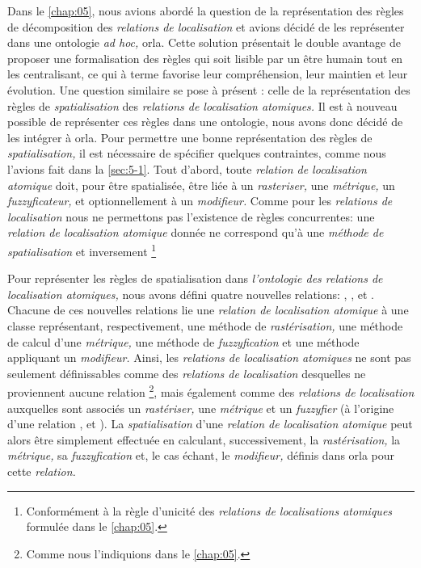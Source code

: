 Dans le \autoref{chap:05}, nous avions abordé la question de la
représentation des règles de décomposition des \emph{relations de
  localisation} et avions décidé de les représenter dans une ontologie
\emph{ad hoc,} \ac{orla}. Cette solution présentait le double avantage
de proposer une formalisation des règles qui soit lisible par un être
humain tout en les centralisant, ce qui à terme favorise leur
compréhension, leur maintien et leur évolution. Une question similaire
se pose à présent : celle de la représentation des règles de
\emph{spatialisation} des \emph{relations de localisation atomiques.}
Il est à nouveau possible de représenter ces règles dans une
ontologie, nous avons donc décidé de les intégrer à \ac{orla}. Pour
permettre une bonne représentation des règles de
\emph{spatialisation,} il est nécessaire de spécifier quelques
contraintes, comme nous l'avions fait dans la \autoref{sec:5-1}. Tout
d'abord, toute \emph{relation de localisation atomique} doit, pour
être spatialisée, être liée à un \emph{rasteriser,} une
\emph{métrique,} un \emph{fuzzyficateur,} et optionnellement à un
\emph{modifieur.} Comme pour les \emph{relations de localisation} nous
ne permettons pas l’existence de règles concurrentes: une
\emph{relation de localisation atomique} donnée ne correspond qu'à une
\emph{méthode de spatialisation} et inversement \footnote{Conformément
  à la règle d'unicité des \emph{relations de localisations atomiques}
  formulée dans le \autoref{chap:05}.}

Pour représenter les règles de spatialisation dans \emph{l'ontologie
  des relations de localisation atomiques,} nous avons défini quatre
nouvelles relations: ,
,  et
. Chacune de ces nouvelles relations lie
une \emph{relation de localisation atomique} à une classe
représentant, respectivement, une méthode de \emph{rastérisation,} une
méthode de calcul d'une \emph{métrique,} une méthode de
\emph{fuzzyfication} et une méthode appliquant un \emph{modifieur.}
Ainsi, les \emph{relations de localisation atomiques} ne sont pas
seulement définissables comme des \emph{relations de localisation}
desquelles ne proviennent aucune relation
 \footnote{Comme nous
  l'indiquions dans le \autoref{chap:05}.}, mais également comme des
\emph{relations de localisation} auxquelles sont associés un
\emph{rastériser,} une \emph{métrique} et un \emph{fuzzyfier} (\ie à
l'origine d'une relation ,
 et ). La
\emph{spatialisation} d'une \emph{relation de localisation atomique}
peut alors être simplement effectuée en calculant, successivement, la
\emph{rastérisation,} la \emph{métrique,} sa \emph{fuzzyfication} et,
le cas échant, le \emph{modifieur,} définis dans \ac{orla} pour cette
\emph{relation.}

